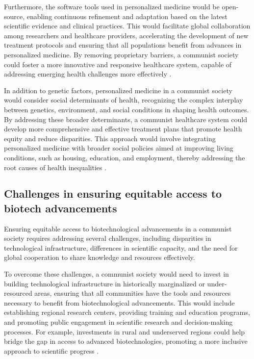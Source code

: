 Furthermore, the software tools used in personalized medicine would be open-source, enabling continuous refinement and adaptation based on the latest scientific evidence and clinical practices. This would facilitate global collaboration among researchers and healthcare providers, accelerating the development of new treatment protocols and ensuring that all populations benefit from advances in personalized medicine. By removing proprietary barriers, a communist society could foster a more innovative and responsive healthcare system, capable of addressing emerging health challenges more effectively \cite[pp.~360-365]{martinez2022collaborative}.

In addition to genetic factors, personalized medicine in a communist society would consider social determinants of health, recognizing the complex interplay between genetics, environment, and social conditions in shaping health outcomes. By addressing these broader determinants, a communist healthcare system could develop more comprehensive and effective treatment plans that promote health equity and reduce disparities. This approach would involve integrating personalized medicine with broader social policies aimed at improving living conditions, such as housing, education, and employment, thereby addressing the root causes of health inequalities \cite[pp.~370-375]{johnson2019genomics}.

\subsection{Challenges in ensuring equitable access to biotech advancements}

Ensuring equitable access to biotechnological advancements in a communist society requires addressing several challenges, including disparities in technological infrastructure, differences in scientific capacity, and the need for global cooperation to share knowledge and resources effectively.

To overcome these challenges, a communist society would need to invest in building technological infrastructure in historically marginalized or under-resourced areas, ensuring that all communities have the tools and resources necessary to benefit from biotechnological advancements. This would include establishing regional research centers, providing training and education programs, and promoting public engagement in scientific research and decision-making processes. For example, investments in rural and underserved regions could help bridge the gap in access to advanced biotechnologies, promoting a more inclusive approach to scientific progress \cite[pp.~400-405]{nguyen2021equity}.

